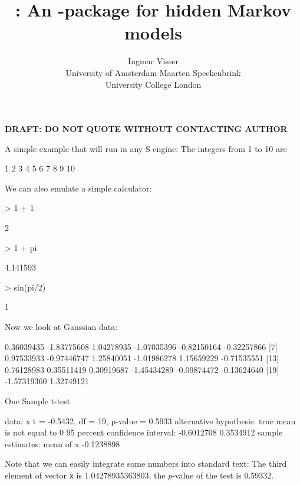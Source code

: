 \documentclass[article]{jss}
\author{Ingmar Visser\\University of Amsterdam \And 
        Maarten Speekenbrink\\University College London}
\title{\pkg{depmixS4} : An \proglang{R}-package for hidden Markov models}
\begin{document}
\maketitle



\begin{center}
\bf{DRAFT: DO NOT QUOTE WITHOUT CONTACTING AUTHOR}
\end{center}


A simple example that will run in any S engine: The integers from 1 to
10 are
\begin{Schunk}
\begin{Soutput}
 [1]  1  2  3  4  5  6  7  8  9 10
\end{Soutput}
\end{Schunk}

We can also emulate a simple calculator:
\begin{Schunk}
\begin{Sinput}
> 1 + 1
\end{Sinput}
\begin{Soutput}
[1] 2
\end{Soutput}
\begin{Sinput}
> 1 + pi
\end{Sinput}
\begin{Soutput}
[1] 4.141593
\end{Soutput}
\begin{Sinput}
> sin(pi/2)
\end{Sinput}
\begin{Soutput}
[1] 1
\end{Soutput}
\end{Schunk}

Now we look at Gaussian data:

\begin{Schunk}
\begin{Soutput}
 [1]  0.36039435 -1.83775608  1.04278935 -1.07035396 -0.82150164 -0.32257866
 [7]  0.97533933 -0.97446747  1.25840051 -1.01986278  1.15659229 -0.71535551
[13]  0.76128983  0.35511419  0.30919687 -1.45434289 -0.09874472 -0.13624640
[19] -1.57319360  1.32749121
\end{Soutput}
\begin{Soutput}
	One Sample t-test

data:  x 
t = -0.5432, df = 19, p-value = 0.5933
alternative hypothesis: true mean is not equal to 0 
95 percent confidence interval:
 -0.6012708  0.3534912 
sample estimates:
 mean of x 
-0.1238898 
\end{Soutput}
\end{Schunk}
Note that we can easily integrate some numbers into standard text: The
third element of vector \texttt{x} is 1.04278935363803, the
$p$-value of the test is 0.59332. %
\end{document}
